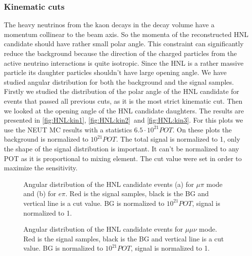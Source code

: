 \documentclass[../main.tex]{subfiles}
\begin{document}
\subsubsection{Kinematic cuts}
The heavy neutrinos from the kaon decays in the decay volume have a momentum collinear to the beam axis. So the momenta of the reconstructed HNL candidate should have rather small polar angle. This constraint can significantly reduce the background because the direction of the charged particles from the active neutrino interactions is quite isotropic. Since the HNL is a rather massive particle its daughter particles shouldn't have large opening angle. We have studied angular distribution for both the background and the signal samples. Firstly we studied the distribution of the polar angle of the HNL candidate for events that passed all previous cuts, as it is the most strict kinematic cut. Then we looked at the opening angle of the HNL candidate daughters. The results are presented in \autoref{fig:HNL:kin1}, \autoref{fig:HNL:kin2}~and \autoref{fig:HNL:kin3}. For this plots we use the NEUT MC results with a statistics $6.5\cdot 10^{21} POT$. On these plots the background is normalized to $10^{21}POT$. The total signal is normalized to 1, only the shape of the signal distribution is important. It can't be normalized to any POT as it is proportional to mixing element. The cut value were set in order to maximize the sensitivity.

\begin{figure}[!ht]
  \begin{minipage}[h]{0.49\linewidth}
  \end{minipage}
  \hfill
  \begin{minipage}[h]{0.49\linewidth}
  \end{minipage}
  \caption{Angular distribution of the HNL candidate events (a) for $\mu\pi$ mode and (b) for $e\pi$. Red is the signal samples, black is the BG and vertical line is a cut value. BG is normalized to $10^{21}POT$, signal is normalized to 1.}
  \label{fig:HNL:kin1}
\end{figure}

\begin{figure}[!ht]
  \caption{Angular distribution of the HNL candidate events for $\mu\mu\nu$ mode. Red is the signal samples, black is the BG and vertical line is a cut value. BG is normalized to $10^{21}POT$, signal is normalized to 1.}
  \label{fig:HNL:kin2}
\end{figure}
\end{document}
